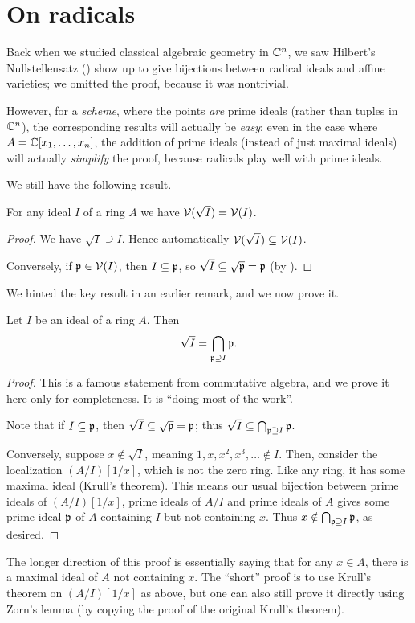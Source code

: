 \section{On radicals}
Back when we studied classical algebraic geometry in $\mathbb C^n$,
we saw Hilbert's Nullstellensatz () show up
to give bijections between radical ideals and affine varieties;
we omitted the proof, because it was nontrivial.

However, for a \emph{scheme}, where the points \emph{are} prime ideals
(rather than tuples in $\mathbb C^n$),
the corresponding results will actually be \emph{easy}:
even in the case where $A = \mathbb C[x_1, \dots, x_n]$,
the addition of prime ideals (instead of just maximal ideals)
will actually \emph{simplify} the proof,
because radicals play well with prime ideals.

We still have the following result.
\begin{proposition}
	[$\VV(\sqrt I) = \VV(I)$]
	For any ideal $I$ of a ring $A$
	we have $\VV(\sqrt I) = \VV(I)$.
\end{proposition}
\begin{proof}
	We have $\sqrt I \supseteq I$.
	Hence automatically $\mathcal V(\sqrt I) \subseteq \mathcal V(I)$.

	Conversely, if $\mathfrak p \in \mathcal V(I)$, then $I \subseteq \mathfrak p$,
	so $\sqrt I \subseteq \sqrt{\mathfrak p} = \mathfrak p$
	(by ).
\end{proof}

We hinted the key result in an earlier remark,
and we now prove it.
\begin{theorem}
	\label{thm:radical_intersect_prime}
	Let $I$ be an ideal of a ring $A$.
	Then \[ \sqrt I = \bigcap_{\mathfrak p \supseteq I} \mathfrak p. \]
\end{theorem}
\begin{proof}
	This is a famous statement from commutative algebra,
	and we prove it here only for completeness.
	It is ``doing most of the work''.

	Note that if $I \subseteq \mathfrak p$,
	then $\sqrt I \subseteq \sqrt{\mathfrak p} = \mathfrak p$;
	thus $\sqrt I \subseteq \bigcap_{\mathfrak p \supseteq I} \mathfrak p$.

	Conversely, suppose $x \notin \sqrt I$,
	meaning $1, x, x^2, x^3, \dots \notin I$.
	Then, consider the localization $(A/I)[1/x]$, which is not the zero ring.
	Like any ring, it has some maximal ideal (Krull's theorem).
	This means our usual bijection between prime ideals of $(A/I)[1/x]$,
	prime ideals of $A/I$ and prime ideals of $A$
	gives some prime ideal $\mathfrak p$ of $A$ containing $I$ but not containing $x$.
	Thus $x \notin \bigcap_{\mathfrak p \supseteq I} \mathfrak p$,
	as desired.
\end{proof}
\begin{remark}
	The longer direction of this proof is essentially
	saying that for any $x \in A$,
	there is a maximal ideal of $A$ not containing $x$.
	The ``short'' proof is to use Krull's theorem on $(A/I)[1/x]$ as above,
	but one can also still prove it directly using Zorn's lemma
	(by copying the proof of the original Krull's theorem).
\end{remark}


